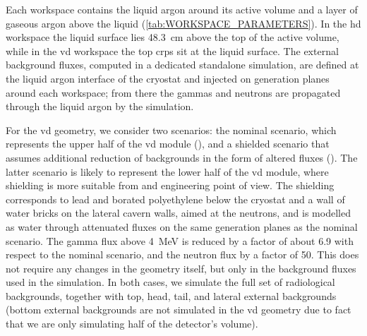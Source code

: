 Each workspace contains the liquid argon around its active volume and a layer of gaseous argon above the liquid (\cref{tab:WORKSPACE_PARAMETERS}). In the \gls{hd} workspace the liquid surface lies \SI{48.3}{\centi\meter} above the top of the active volume, while in the \gls{vd} workspace the top \gls{crp}s sit at the liquid surface. The external background fluxes, computed in a dedicated standalone simulation, are defined at the liquid argon interface of the cryostat and injected on generation planes around each workspace; from there the gammas and neutrons are propagated through the liquid argon by the simulation.

For the \gls{vd} geometry, we consider two scenarios: the nominal scenario, which represents the upper half of the \gls{vd} module (), and a shielded scenario that assumes additional reduction of backgrounds in the form of altered fluxes (). The latter scenario is likely to represent the lower half of the \gls{vd} module, where shielding is more suitable from and engineering point of view. The shielding corresponds to lead and borated polyethylene below the cryostat and a wall of water bricks on the lateral cavern walls, aimed at the neutrons, and is modelled as water through attenuated fluxes on the same generation planes as the nominal scenario. The gamma flux above \SI{4}{\mega\electronvolt} is reduced by a factor of about 6.9 with respect to the nominal scenario, and the neutron flux by a factor of 50. This does not require any changes in the geometry itself, but only in the background fluxes used in the simulation. In both cases, we simulate the full set of radiological backgrounds, together with top, head, tail, and lateral external backgrounds (bottom external backgrounds are not simulated in the \gls{vd} geometry due to fact that we are only simulating half of the detector's volume).